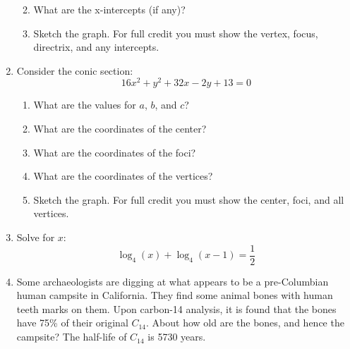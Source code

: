 \documentclass[letterpaper,12pt,fleqn]{article}
\begin{document}
\begin{enumerate}
\begin{enumerate}
    \vspace{1in}
    
  \item What are the x-intercepts (if any)?

    \vspace{1in}
    
  \item Sketch the graph. For full credit you must show the vertex, focus,
    directrix, and any intercepts.

  \end{enumerate}

  \newpage

\item Consider the conic section:
  \[16x^2+y^2+32x-2y+13=0\]
  \begin{enumerate}
  \item What are the values for $a$, $b$, and $c$?

    \vspace{4in}
      
  \item What are the coordinates of the center?

    \vspace{1in}
      
  \item What are the coordinates of the foci?

    \vspace{1in}
      
  \item What are the coordinates of the vertices?

    \newpage
      
  \item Sketch the graph. For full credit you must show the center, foci, and
    all vertices.

  \end{enumerate}

  \vspace{0.5in}

\item Solve for $x$:
  \[\log_4(x)+\log_4(x-1)=\frac{1}{2}\]

  \newpage
  
\item Some archaeologists are digging at what appears to be a pre-Columbian
  human campsite in California.  They find some animal bones with human teeth
  marks on them.  Upon carbon-14 analysis, it is found that the bones have 75\%
  of their original $C_{14}$.  About how old are the bones, and hence the
  campsite?  The half-life of $C_{14}$ is 5730 years.

\end{enumerate}
\end{document}
